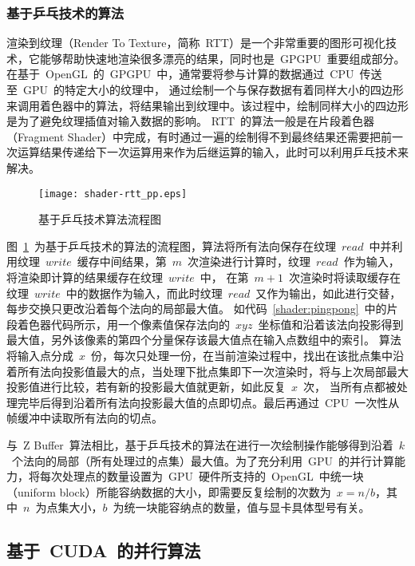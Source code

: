 \subsubsection{基于乒乓技术的算法}

渲染到纹理（Render To Texture，简称~RTT）是一个非常重要的图形可视化技术，它能够帮助快速地渲染很多漂亮的结果，同时也是~GPGPU~重要组成部分。在基于~OpenGL~的~GPGPU~中，通常要将参与计算的数据通过~CPU~传送至~GPU~的特定大小的纹理中，
通过绘制一个与保存数据有着同样大小的四边形来调用着色器中的算法\cite{gpgpuqiu}，将结果输出到纹理中。该过程中，绘制同样大小的四边形是为了避免纹理插值对输入数据的影响。
RTT~的算法一般是在片段着色器（Fragment Shader）中完成，有时通过一遍的绘制得不到最终结果还需要把前一次运算结果传递给下一次运算用来作为后继运算的输入，此时可以利用乒乓技术来解决。

\begin{figure}[htbp]
  \centering
  \texttt{[image: shader-rtt\_pp.eps]}
  \caption{基于乒乓技术算法流程图}
  \label{fig:shader-rtt-pingpong-flowchart}
\end{figure}

图~\ref{fig:shader-rtt-pingpong-flowchart}~为基于乒乓技术的算法的流程图，算法将所有法向保存在纹理~$read$~中并利用纹理~$write$~缓存中间结果，第~$m$~次渲染进行计算时，纹理~$read$~作为输入，将渲染即计算的结果缓存在纹理~$write$~中，
在第~$m+1$~次渲染时将读取缓存在纹理~$write$~中的数据作为输入，而此时纹理~$read$~又作为输出，如此进行交替，每步交换只更改沿着每个法向的局部最大值。
如代码~\ref{shader:pingpong}~中的片段着色器代码所示，用一个像素值保存法向的~$xyz$~坐标值和沿着该法向投影得到最大值，另外该像素的第四个分量保存该最大值点在输入点数组中的索引。
算法将输入点分成~$x$~份，每次只处理一份，在当前渲染过程中，找出在该批点集中沿着所有法向投影值最大的点，当处理下批点集即下一次渲染时，将与上次局部最大投影值进行比较，若有新的投影最大值就更新，如此反复~$x$~次，
当所有点都被处理完毕后得到沿着所有法向投影最大值的点即切点。最后再通过~CPU~一次性从帧缓冲中读取所有法向的切点。


与~Z Buffer~算法相比，基于乒乓技术的算法在进行一次绘制操作能够得到沿着~$k$~个法向的局部（所有处理过的点集）最大值。为了充分利用~GPU~的并行计算能力，将每次处理点的数量设置为~GPU~硬件所支持的~OpenGL~中统一块（uniform
block）所能容纳数据的大小，即需要反复绘制的次数为~$x=n/b$，其中~$n$~为点集大小，$b$~为统一块能容纳点的数量，值与显卡具体型号有关。 

\subsection{基于~CUDA~的并行算法}
\label{subsec:determ-normals-by-cuda}

